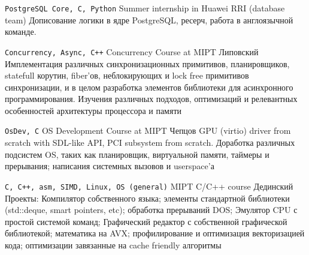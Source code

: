 \documentclass[9pt]{developercv} %
\begin{document}


\begin{entrylist}
	\entry
	{\texttt{PostgreSQL Core, C, Python}}
	{Summer internship in Huawei RRI (database team)}
	{}
	{Дописование логики в ядре PostgreSQL, ресерч, работа в англоязычной команде.}

        \entry
        {\texttt{Concurrency, Async, C++}}
        {Concurrency Course at MIPT}
        {Липовский}
        {Имплементация различных синхронизационных примитивов, планировщиков, statefull корутин, fiber'ов, неблокирующих и lock free примитивов синхронизации, и в целом разработка элементов библиотеки для асинхронного программирования. Изучения различных подходов, оптимизаций и релевантных особенностей архитектуры процессора и памяти}

        \entry
        {\texttt{OsDev, C}}
        {OS Development Course at MIPT}
        {Чепцов}
        {GPU (virtio) driver from scratch with SDL-like API, PCI subsystem from scratch. Доработка различных подсистем OS, таких как планировщик, виртуальной памяти, таймеры и прерывания; написания системных вызовов и userspace'а}
 
	\entry
        {\texttt{C, C++, asm, SIMD, Linux, OS (general)}}
		{MIPT C/C++ course}
		{Дединский}
		{Проекты: Компилятор собственного языка; элементы стандартной библиотеки (std::deque, smart pointers, etc); обработка прерываний DOS; Эмулятор CPU с простой системой команд; Графический редактор с собственной графической библиотекой;  математика на AVX; профилирование и оптимизация векторизацией кода; оптимизации завязанные на cache friendly алгоритмы}

\end{entrylist}

\end{document}
